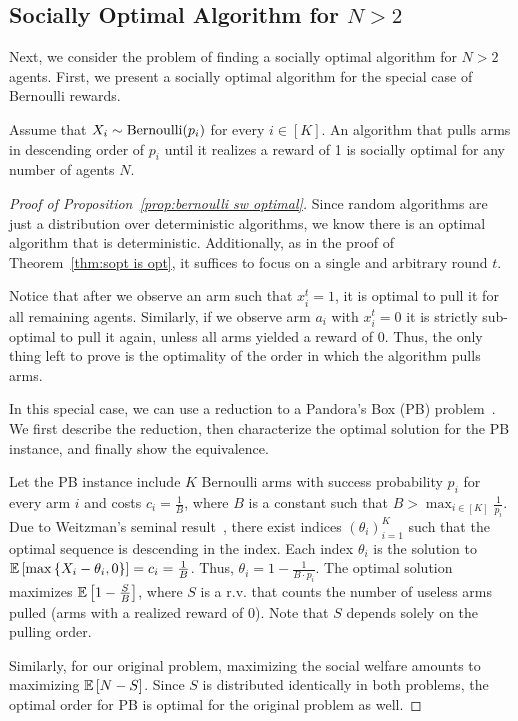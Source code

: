 \subsection{Socially Optimal Algorithm for $N >2$}\label{subsec:sopt for N>2}
Next, we consider the problem of finding a socially optimal algorithm for $N >2$ agents. First, we present a socially optimal algorithm for the special case of Bernoulli rewards.

\begin{proposition}\label{prop:bernoulli sw optimal}
    Assume that $X_i \sim \text{Bernoulli}\!\left(p_i\right)$ for every $i \in [K]$. An algorithm that pulls arms in descending order of $p_i$ until it realizes a reward of 1 is socially optimal for any number of agents $N$.
\end{proposition}
\begin{proof}[Proof of Proposition~\ref{prop:bernoulli sw optimal}]
    Since random algorithms are just a distribution over deterministic algorithms, we know there is an optimal algorithm that is deterministic. Additionally, as in the proof of Theorem~\ref{thm:sopt is opt}, it suffices to focus on a single and arbitrary round $t$.
    
    Notice that after we observe an arm such that $x^t_i =1$, it is optimal to pull it for all remaining agents.
    Similarly,  if we observe arm $a_i$ with $x^t_i =0$ it is strictly sub-optimal to pull it again, unless all arms yielded a reward of 0.
    Thus, the only thing left to prove is the optimality of the order in which the algorithm pulls arms.

    In this special case, we can use a reduction to a Pandora's Box (PB) problem~\cite{weitzman1978optimal}. We first describe the reduction, then characterize the optimal solution for the PB instance, and finally show the equivalence. 
       
    Let the PB instance include $K$ Bernoulli arms with success probability $p_i$ for every arm $i$ and costs $c_i = \frac{1}{B}$, where $B$ is a constant such that $B > \max_{i \in [K]} \frac{1}{p_i}$. Due to Weitzman's seminal result~\cite{weitzman1978optimal}, there exist indices $(\theta_i)_{i=1}^K$ such that the optimal sequence is descending in the index. Each index  $\theta_i$ is the solution to $\mathbb{E}\left[ \max\left\{X_i - \theta_i,0 \right\} \right]  =c_i =\frac{1}{B}$. Thus, $\theta_i = 1- \frac{1}{B\cdot p_i}$. The optimal solution maximizes $\mathbb{E}\left[ 1-\frac{S}{B} \right]$, where $S$ is a r.v. that counts the number of useless arms pulled (arms with a realized reward of 0). Note that $S$ depends solely on the pulling order.

    Similarly, for our original problem, maximizing the social welfare amounts to maximizing $\mathbb{E}\left[ N-S \right]$. Since $S$ is distributed identically in both problems, the optimal order for PB is optimal for the original problem as well.
\end{proof}
